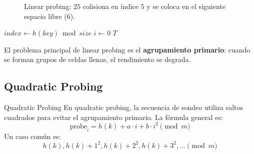 \begin{figure}[htbp]
    \centering
    \caption{Linear probing: \(25\) colisiona en índice \(5\) y se coloca en el siguiente espacio libre (\(6\)).}
    \label{fig:linear-probing}
\end{figure}

\begin{algorithm}[H]
\caption{Inserción con Linear Probing}
\label{alg:linear-probing-insert}
\(index \leftarrow h(key) \bmod size\)\;
\(i \leftarrow 0\)\;
\Return \(T\)\;
\end{algorithm}

\begin{observacion}
El problema principal de linear probing es el \textbf{agrupamiento primario}: cuando se forman grupos de celdas llenas, el rendimiento se degrada.
\end{observacion}

\subsection{Quadratic Probing}
\label{subsec:quadratic-probing}

\begin{definicion}{Quadratic Probing}
En quadratic probing, la secuencia de sondeo utiliza saltos cuadrados para evitar el agrupamiento primario. La fórmula general es:
\[
\text{probe}_i = h(k) + a \cdot i + b \cdot i^2 \pmod{m}
\]
Un caso común es:
\[
h(k), h(k)+1^2, h(k)+2^2, h(k)+3^2, \ldots \pmod{m}
\]
\end{definicion}

